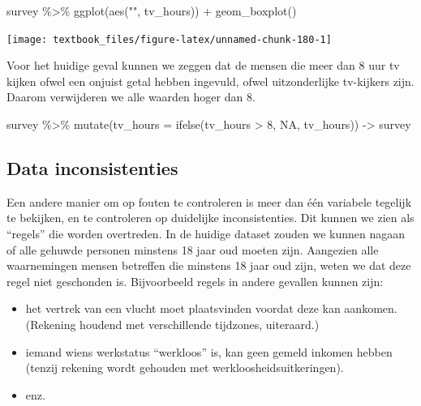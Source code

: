\documentclass[]{tufte-book}
\newenvironment{Shaded}{}{}
\newcommand{\AttributeTok}[1]{\textcolor[rgb]{0.49,0.56,0.16}{#1}}
\newcommand{\ConstantTok}[1]{\textcolor[rgb]{0.53,0.00,0.00}{#1}}
\newcommand{\DecValTok}[1]{\textcolor[rgb]{0.25,0.63,0.44}{#1}}
\newcommand{\FunctionTok}[1]{\textcolor[rgb]{0.02,0.16,0.49}{#1}}
\newcommand{\NormalTok}[1]{#1}
\newcommand{\OtherTok}[1]{\textcolor[rgb]{0.00,0.44,0.13}{#1}}
\newcommand{\SpecialCharTok}[1]{\textcolor[rgb]{0.25,0.44,0.63}{#1}}
\newcommand{\StringTok}[1]{\textcolor[rgb]{0.25,0.44,0.63}{#1}}
\providecommand{\tightlist}{%
  \setlength{\itemsep}{0pt}\setlength{\parskip}{0pt}}
\begin{document}
\begin{Shaded}
\begin{Highlighting}[]
\NormalTok{survey }\SpecialCharTok{\%\textgreater{}\%}
  \FunctionTok{ggplot}\NormalTok{(}\FunctionTok{aes}\NormalTok{(}\StringTok{""}\NormalTok{, tv\_hours)) }\SpecialCharTok{+}
  \FunctionTok{geom\_boxplot}\NormalTok{()}
\end{Highlighting}
\end{Shaded}

\texttt{[image: textbook\_files/figure-latex/unnamed-chunk-180-1]}

Voor het huidige geval kunnen we zeggen dat de mensen die meer dan 8 uur tv kijken ofwel een onjuist getal hebben ingevuld, ofwel uitzonderlijke tv-kijkers zijn. Daarom verwijderen we alle waarden hoger dan 8.

\begin{Shaded}
\begin{Highlighting}[]
\NormalTok{survey }\SpecialCharTok{\%\textgreater{}\%}
  \FunctionTok{mutate}\NormalTok{(}\AttributeTok{tv\_hours =} \FunctionTok{ifelse}\NormalTok{(tv\_hours }\SpecialCharTok{\textgreater{}} \DecValTok{8}\NormalTok{, }\ConstantTok{NA}\NormalTok{, tv\_hours)) }\OtherTok{{-}\textgreater{}}\NormalTok{ survey}
\end{Highlighting}
\end{Shaded}

\hypertarget{data-inconsistenties}{%
\subsection{Data inconsistenties}\label{data-inconsistenties}}

Een andere manier om op fouten te controleren is meer dan één variabele tegelijk te bekijken, en te controleren op duidelijke inconsistenties. Dit kunnen we zien als ``regels'' die worden overtreden. In de huidige dataset zouden we kunnen nagaan of alle gehuwde personen minstens 18 jaar oud moeten zijn. Aangezien alle waarnemingen mensen betreffen die minstens 18 jaar oud zijn, weten we dat deze regel niet geschonden is.
Bijvoorbeeld regels in andere gevallen kunnen zijn:

\begin{itemize}
\tightlist
\item
  het vertrek van een vlucht moet plaatsvinden voordat deze kan aankomen. (Rekening houdend met verschillende tijdzones, uiteraard.)
\item
  iemand wiens werkstatus ``werkloos'' is, kan geen gemeld inkomen hebben (tenzij rekening wordt gehouden met werkloosheidsuitkeringen).
\item
  enz.
\end{itemize}
\end{document}
